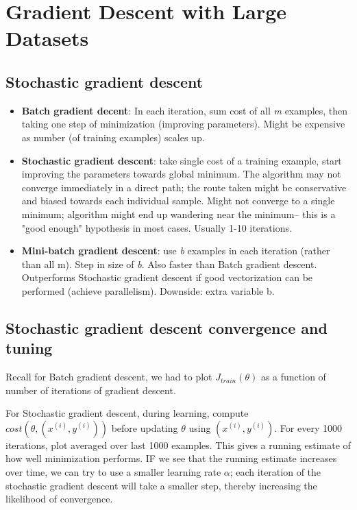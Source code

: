 \section{Gradient Descent with Large Datasets}
\subsection{Stochastic gradient descent}
\begin{itemize}
    \item \textbf{Batch gradient decent}:  In each iteration, sum cost of all \emph{m} examples, then taking one step of minimization (improving parameters). Might be expensive as number (of training examples) scales up.
    \item \textbf{Stochastic gradient descent}: take single cost of a training example, start improving the parameters towards global minimum. The algorithm may not converge immediately in a direct path; the route taken might be conservative and biased towards each individual sample. Might not converge to a single minimum; algorithm might end up wandering near the minimum-- this is a "good enough" hypothesis in most cases. Usually 1-10 iterations.
    \item \textbf{Mini-batch gradient descent}: use \emph{b} examples in each iteration (rather than all m). Step in size of \emph{b}. Also faster than Batch gradient descent. Outperforms Stochastic gradient descent if good vectorization can be performed (achieve parallelism). Downside: extra variable b.
\end{itemize}
\subsection{Stochastic gradient descent convergence and tuning}
\par Recall for Batch gradient descent, we had to plot $J_{train} (\theta)$ as a function of number of iterations of gradient descent. 

\par For Stochastic gradient descent, during learning, compute $cost(\theta, (x^{(i)}, y^{(i)}))$ before updating $\theta$ using $(x^{(i)}, y^{(i)})$. For every 1000 iterations, plot averaged over last 1000 examples. This gives a running estimate of how well minimization performs. IF we see that the running estimate increases over time, we can try to use a smaller learning rate $\alpha$; each iteration of the stochastic gradient descent will take a smaller step, thereby increasing the likelihood of convergence. 





